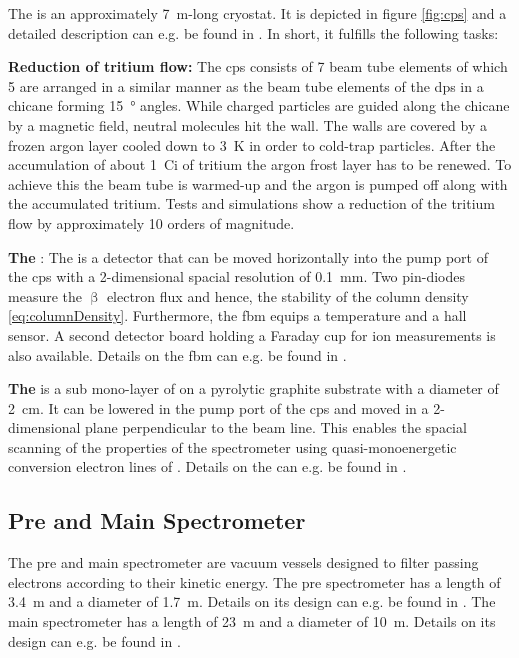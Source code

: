     The  is an approximately \SI{7}{m}-long cryostat. It is depicted in figure \ref{fig:cps} and a detailed description can e.g. be found in \cite{Jansen2015}. In short, it fulfills the following tasks:
    {\par\textbf{Reduction of tritium flow:}
    The \gls{cps} consists of 7 beam tube elements of which 5 are arranged in a similar manner as the beam tube elements of the \gls{dps} in a chicane forming \SI{15}{\degree} angles. While charged particles are guided along the chicane by a magnetic field, neutral molecules hit the wall. The walls are covered by a frozen argon layer cooled down to \SI{3}{K} in order to cold-trap particles. After the accumulation of about \SI{1}{Ci} of tritium the argon frost layer has to be renewed. To achieve this the beam tube is warmed-up and the argon is pumped off along with the accumulated tritium. Tests and simulations show a reduction of the tritium flow by approximately 10 orders of magnitude.}

    {\par\textbf{The }: The  is a detector that can be moved horizontally into the pump port of the \gls{cps} with a 2-dimensional spacial resolution of \SI{0.1}{mm}. Two pin-diodes measure the $\upbeta$ electron flux and hence, the stability of the column density \eqref{eq:columnDensity}. Furthermore, the \gls{fbm} equips a temperature and a hall sensor. A second detector board holding a Faraday cup for ion measurements is also available. Details on the \gls{fbm} can e.g. be found in \cite{Ellinger2017}.}
    
    {\par\textbf{The } is a sub mono-layer of \kryptonEightyThree{} on a pyrolytic graphite substrate with a diameter of \SI{2}{cm}. It can be lowered in the pump port of the \gls{cps} and moved in a 2-dimensional plane perpendicular to the beam line. This enables the spacial scanning of the properties of the spectrometer using quasi-monoenergetic conversion electron lines of \kryptonEightyThree. Details on the  can e.g. be found in \cite{Bauer2014}.}
    
    \subsection{Pre and Main Spectrometer}
    \label{sec:spectrometer}
    
    The pre and main spectrometer are vacuum vessels designed to filter passing electrons according to their kinetic energy. The pre spectrometer has a length of \SI{3.4}{m} and a diameter of \SI{1.7}{m}. Details on its design can e.g. be found in \cite{Prall2012}. The main spectrometer has a length of \SI{23}{m} and a diameter of \SI{10}{m}. Details on its design can e.g. be found in \cite{Angrik:2005ep}.
    
